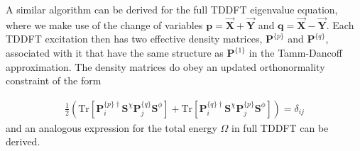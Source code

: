 \documentclass[letterpaper,10pt,english]{sphinxmanual}
\begin{document}
A similar algorithm can be derived for the full TDDFT eigenvalue
equation, where we make use of the change of variables
\(\textbf{p}=\vec{\textbf{X}}+\vec{\textbf{Y}}\) and
\(\textbf{q}=\vec{\textbf{X}}-\vec{\textbf{Y}}\). Each TDDFT
excitation then has two effective density matrices,
\(\textbf{P}^{\{p\}}\) and \(\textbf{P}^{\{q\}}\), associated
with it that have the same structure as \(\textbf{P}^{\{1\}}\) in
the Tamm-Dancoff approximation. The density matrices do obey an updated
orthonormality constraint of the form

\label{\detokenize{lr_tddft:equation-ortho2}}\begin{equation}\label{equation:lr_tddft:ortho2}
\begin{split} \frac{1}{2}\left(\textrm{Tr}\left[\textbf{P}^{\{p\}\dagger}_i\textbf{S}^{\chi}\textbf{P}^{\{q\}}_j\textbf{S}^\phi\right]+ \textrm{Tr}\left[\textbf{P}^{\{q\}\dagger}_i\textbf{S}^{\chi}\textbf{P}^{\{p\}}_j\textbf{S}^\phi\right]\right)=\delta_{ij}\end{split}
\end{equation}
and an analogous expression for the total energy \(\Omega\) in full
TDDFT can be derived.
\end{document}
